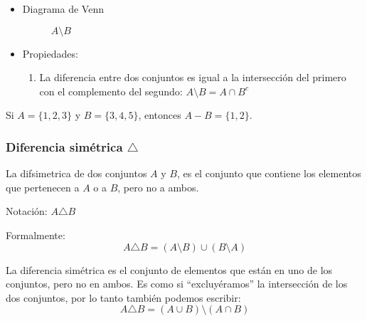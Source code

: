 \begin{itemize}
	\item Diagrama de Venn
	\begin{figure}[H]
		\centering
		\begin{venndiagram2sets}
			\fillOnlyA
		\end{venndiagram2sets}
		\caption*{$A \setminus B$}
	\end{figure}
	\item Propiedades:
	\begin{enumerate}[label=\roman*)]
		\item La diferencia entre dos conjuntos es igual a la intersección del primero con el complemento del segundo: \( A \setminus B = A \cap B^c \)
	\end{enumerate}
\end{itemize}

\begin{example}
	Si \(A = \{1, 2, 3\}\) y \(B = \{3, 4, 5\}\), entonces \(A - B = \{1, 2\}\).
\end{example}

\subsubsection{Diferencia simétrica $\triangle$}
\vspace{1em}
\begin{fmd-definition}
	La \gls{difsimetrica} de dos conjuntos \(A\) y \(B\), es el conjunto que contiene los elementos que pertenecen a \(A\) o a \(B\), pero no a ambos.
	
	Notación: \(A \triangle B\)
	
	Formalmente:
	$$A \triangle B = (A \setminus B) \cup (B \setminus A)$$
	
	La diferencia simétrica es el conjunto de elementos que están en uno de los conjuntos, pero no en ambos. Es como si ``excluyéramos'' la intersección de los dos conjuntos, por lo tanto también podemos escribir:
	\[ A \triangle B = \left( A \cup B \right) \setminus \left( A \cap B \right) \]
\end{fmd-definition}

